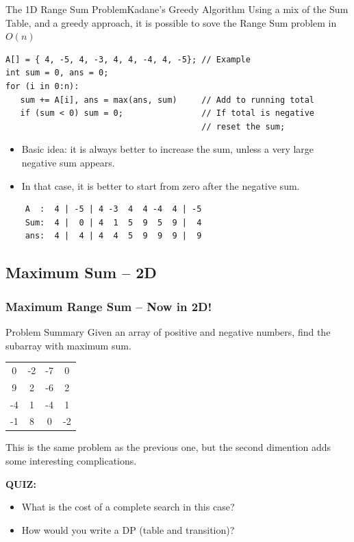\begin{frame}[fragile]{The 1D Range Sum Problem}{Kadane's Greedy Algorithm}
  Using a mix of the Sum Table, and a greedy approach, it is possible to sove the Range Sum problem in $O(n)$

  \begin{block}{}
      {\smaller
\begin{verbatim}
A[] = { 4, -5, 4, -3, 4, 4, -4, 4, -5}; // Example
int sum = 0, ans = 0;
for (i in 0:n):
   sum += A[i], ans = max(ans, sum)     // Add to running total
   if (sum < 0) sum = 0;                // If total is negative
                                        // reset the sum;
\end{verbatim}
      }
  \end{block}

\begin{itemize}
\item Basic idea: it is always better to increase the sum,
unless a very large negative sum appears.
\item In that case, it is better to start from zero after the negative sum.
\end{itemize}
\begin{verbatim}
    A  :  4 | -5 | 4 -3  4  4 -4  4 | -5
    Sum:  4 |  0 | 4  1  5  9  5  9 |  4
    ans:  4 |  4 | 4  4  5  9  9  9 |  9
\end{verbatim}
\end{frame}

\subsection{Maximum Sum -- 2D}
\begin{frame}
  \frametitle{Maximum Range Sum -- Now in 2D!}
  \begin{block}{Problem Summary}
    Given an array of positive and negative numbers, find the
    subarray with maximum sum.
  \end{block}
  \begin{center}
    \begin{tabular}{|cccc|}
      \hline
      0 & -2 & -7 & 0\\
      9 & 2 & -6 & 2\\
      -4 & 1 & -4 & 1\\
      -1 & 8 & 0 & -2\\
      \hline
    \end{tabular}
  \end{center}
  \bigskip

  This is the same problem as the previous one, but the second dimention adds some interesting complications.\bigskip

  {\bf QUIZ:}
  \begin{itemize}
    \item What is the cost of a complete search in this case?
    \item How would you write a DP (table and transition)?
  \end{itemize}
\end{frame}

